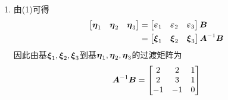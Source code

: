 \documentclass{beamer}
\begin{document}
\begin{frame}[allowframebreaks]
\begin{enumerate}
{              }
        \item {
              由(1)可得
              \begin{align*}
                  \begin{bmatrix}\boldsymbol{\eta}_1&\boldsymbol{\eta}_2&\boldsymbol{\eta}_3\end{bmatrix}
                   & =
                  \begin{bmatrix}\boldsymbol{\varepsilon}_1&\boldsymbol{\varepsilon}_2&\boldsymbol{\varepsilon}_3\end{bmatrix}\boldsymbol{B}          \\
                   & =\begin{bmatrix}\boldsymbol{\xi}_1&\boldsymbol{\xi}_2&\boldsymbol{\xi}_3\end{bmatrix}{\boldsymbol{A}}^{-1}\boldsymbol{B}
              \end{align*}
              因此由基\(\boldsymbol{\xi}_1,\boldsymbol{\xi}_2,\boldsymbol{\xi}_3\)到基\(\boldsymbol{\eta}_1,\boldsymbol{\eta}_2,\boldsymbol{\eta}_3\)的过渡矩阵为
              \begin{equation*}
                  {\boldsymbol{A}}^{-1}\boldsymbol{B}=
                  \begin{bmatrix}
                      2  & 2  & 1 \\
                      2  & 3  & 1 \\
                      -1 & -1 & 0
                  \end{bmatrix}
              \end{equation*}
              }
    \end{enumerate}
\end{frame}
\end{document}
